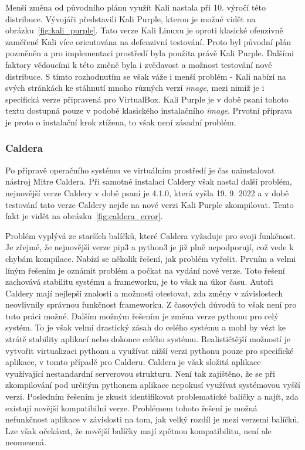 
Menší změna od původního plánu využít Kali nastala při 10. výročí této distribuce\cite{kali_purple}.
Vývojáři představili Kali Purple, kterou je možné vidět na obrázku~\ref{fig:kali_purple}.
Tato verze Kali Linuxu je oproti klasické ofenzivně zaměřené Kali více orientována na defenzivní testování.
Proto byl původní plán pozměněn a pro implementaci prostředí byla použita právě Kali Purple.
Dalšími faktory vědoucími k této změně byla i zvědavost a možnost testování nové distribuce.
S tímto rozhodnutím se však váže i menší problém - Kali nabízí na svých stránkách ke stáhnutí mnoho různých verzí \textit{image}, mezi nimiž je i specifická verze připravená pro VirtualBox.
Kali Purple je v době psaní tohoto textu dostupná pouze v podobě klasického instalačního \textit{image}.
Prvotní příprava je proto o instalační krok ztížena, to však není zásadní problém.

\subsubsection{Caldera}
Po přípravě operačního systému ve virtuálním prostředí je čas nainstalovat nástroj Mitre Caldera.
Při samotné instalaci Caldery však nastal další problém, nejnovější verze Caldery v době psaní je 4.1.0, která vyšla 19. 9. 2022 a v době testování tato verze Caldery nejde na nové verzi Kali Purple zkompilovat.
Tento fakt je vidět na obrázku~\ref{fig:caldera_error}.



Problém vyplývá ze starších balíčků, které Caldera vyžaduje pro svoji funkčnost.
Je zřejmé, že nejnovější verze pip3 a python3 je již plně nepodporují, což vede k chybám kompilace.
Nabízí se několik řešení, jak problém vyřešit.
Prvním a velmi líným řešením je oznámit problém a počkat na vydání nové verze.
Toto řešení zachovává stabilitu systému a frameworku, je to však na úkor času.
Autoři Caldery mají nejlepší znalosti a možnosti otestovat, zda změny v závislostech neovlivnily správnou funkčnost frameworku.
Z časových důvodů to však není pro tuto práci možné.
Dalším možným řešením je změna verze pythonu pro celý systém.
To je však velmi drastický zásah do celého systému a mohl by vézt ke ztrátě stability aplikací nebo dokonce celého systému.
Realističtější možností je vytvořit virtualizaci pythonu a využívat nižší verzi pythonu pouze pro specifické aplikace, v tomto případě pro Calderu.
Caldera je však složitá aplikace využívající nestandardní serverovou strukturu.
Není tak zajištěno, že se při zkompilování pod určitým pythonem aplikace nepokusí využívat systémovou vyšší verzi.
Posledním řešením je zkusit identifikovat problematické balíčky a najít, zda existují novější kompatibilní verze.
Problémem tohoto řešení je možná nefunkčnost aplikace v závislosti na tom, jak velký rozdíl je mezi verzemi balíčků.
Lze však očekávat, že novější balíčky mají zpětnou kompatibilitu, není ale neomezená.

